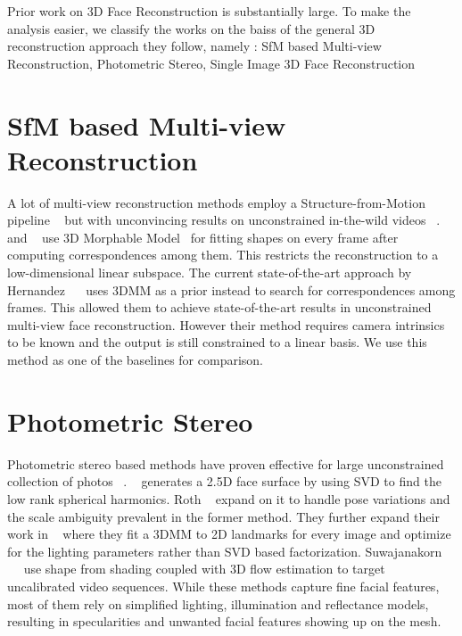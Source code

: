 Prior work on 3D Face Reconstruction is substantially large. To make the analysis easier, we classify the works on the baiss of the general 3D reconstruction approach they follow, namely : SfM based Multi-view Reconstruction, Photometric Stereo, Single Image 3D Face Reconstruction

\section{SfM based Multi-view Reconstruction} A lot of multi-view reconstruction methods employ a Structure-from-Motion pipeline ~\cite{gotardo2015photogeometric, lin2010accurate, fidaleo2007model} but with unconvincing results on unconstrained in-the-wild videos ~\cite{hernandez2017accurate}. ~\cite{brand2001morphable} and ~\cite{shi2014automatic} use 3D Morphable Model~\cite{blanz1999morphable} for fitting shapes on every frame after computing correspondences among them. This restricts the reconstruction to a low-dimensional linear subspace. The current state-of-the-art approach by Hernandez ~\etal ~\cite{hernandez2017accurate} uses 3DMM as a prior instead to search for correspondences among frames. This allowed them to achieve state-of-the-art results in unconstrained multi-view face reconstruction. However their method requires camera intrinsics to be known and the output is still constrained to a linear basis. We use this method as one of the baselines for comparison.

\section{Photometric Stereo} Photometric stereo based methods have proven effective for large unconstrained collection of photos ~\cite{kemelmacher2011face, kemelmacher2013internet, roth2015unconstrained}. ~\cite{kemelmacher2011face} generates a 2.5D face surface by using SVD to find the low rank spherical harmonics. Roth \etal ~\cite{roth2015unconstrained} expand on it to handle pose variations and the scale ambiguity prevalent in the former method. They further expand their work in ~\cite{roth2016adaptive} where they fit a 3DMM to 2D landmarks for every image and optimize for the lighting parameters rather than SVD based factorization. Suwajanakorn ~\etal ~\cite{suwajanakorn2014total} use shape from shading coupled with 3D flow estimation to target uncalibrated video sequences. While these methods capture fine facial features, most of them rely on simplified lighting, illumination and reflectance models, resulting in specularities and unwanted facial features showing up on the mesh.


